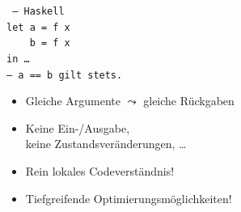 \documentclass[12pt,compress,ngerman]{beamer}
\newcommand{\syncomment}[1]{\color{blue!20!black}#1\color{black}}
\newcommand{\synKey}    [1]{\color{blue!56!black}#1\color{black}}
\begin{document}
{\begin{multicols*}{2}
    \pause
    \texttt{%
      \syncomment{-- Haskell} \\
      \synKey{let}\ a = f x \\
      \ \ \ \ b = f x \\
      \synKey{in}\ \ldots \\
      \syncomment{-- a == b gilt stets.}
    }
  \end{multicols*}

  \vfill
  \pause
  \begin{itemize}
    \item Gleiche Argumente $\leadsto$ gleiche Rückgaben
    \item Keine Ein-/Ausgabe, \\ keine Zustandsveränderungen, \ldots
    \item Rein lokales Codeverständnis!
    \item Tiefgreifende Optimierungsmöglichkeiten!
  \end{itemize}
}
\end{document}
